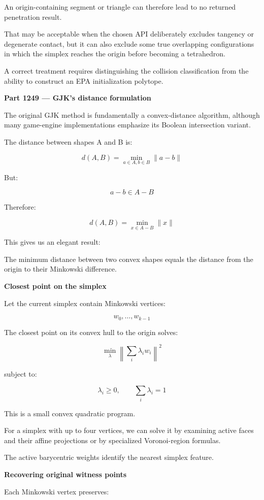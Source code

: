 An origin-containing segment or triangle can therefore lead to no returned penetration result.

That may be acceptable when the chosen API deliberately excludes tangency or degenerate contact, but it can also exclude some true overlapping configurations in which the simplex reaches the origin before becoming a tetrahedron.

A correct treatment requires distinguishing the collision classification from the ability to construct an EPA initialization polytope.

\textbf{Part 1249 --- GJK's distance formulation}

The original GJK method is fundamentally a convex-distance algorithm, although many game-engine implementations emphasize its Boolean intersection variant.

The distance between shapes A and B is:

\[
\boxed{ d(A,B)= \min_{a\in A,b\in B}\|a-b\| }
\]

But:

\[
a-b\in A-B
\]

Therefore:

\[
\boxed{ d(A,B)= \min_{x\in A-B}\|x\| }
\]

This gives us an elegant result:

The minimum distance between two convex shapes equals the distance from the origin to their Minkowski difference.

\textbf{Closest point on the simplex}

Let the current simplex contain Minkowski vertices:

\[
w_0,\ldots,w_{k-1}
\]

The closest point on its convex hull to the origin solves:

\[
\boxed{ \min_{\lambda} \left\| \sum_i\lambda_iw_i \right\|^2 }
\]

subject to:

\[
\lambda_i\ge0,\qquad \sum_i\lambda_i=1
\]

This is a small convex quadratic program.

For a simplex with up to four vertices, we can solve it by examining active faces and their affine projections or by specialized Voronoi-region formulas.

The active barycentric weights identify the nearest simplex feature.

\textbf{Recovering original witness points}

Each Minkowski vertex preserves:

